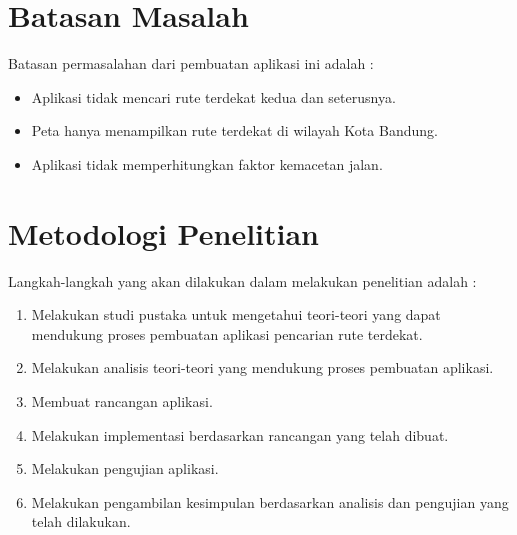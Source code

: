 \section{Batasan Masalah}
Batasan permasalahan dari pembuatan aplikasi ini adalah :
\begin{itemize}
	\item Aplikasi tidak mencari rute terdekat kedua dan seterusnya.
	
	\item Peta hanya menampilkan rute terdekat di wilayah Kota Bandung.
	
	\item Aplikasi tidak memperhitungkan faktor kemacetan jalan.
\end{itemize}

\section{Metodologi Penelitian}
Langkah-langkah yang akan dilakukan dalam melakukan penelitian adalah :
\begin{enumerate}
	\item Melakukan studi pustaka untuk mengetahui teori-teori yang dapat mendukung
	proses pembuatan aplikasi pencarian rute terdekat.
	\item Melakukan analisis teori-teori yang mendukung proses pembuatan aplikasi.
	\item Membuat rancangan aplikasi.
	\item Melakukan implementasi berdasarkan rancangan yang telah dibuat.
	\item Melakukan pengujian aplikasi.
	\item Melakukan pengambilan kesimpulan berdasarkan analisis dan pengujian yang
	telah dilakukan.
\end{enumerate}

